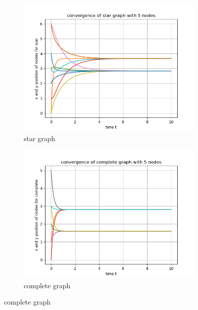 \documentclass{article}
\begin{document}
\begin{problem}
\begin{figure}[!ht]
        \begin{subfigure}{0.4\textwidth}
            \includegraphics[width=\textwidth]{./img/p1convergence_star_graph_5.png}
            \caption{star graph}
        \end{subfigure}
        \begin{subfigure}{0.4\textwidth}
            \includegraphics[width=\textwidth]{./img/p1convergence_complete_graph_5.png}
            \caption{complete graph}
        \end{subfigure}


\end{figure}
\end{problem}
\end{document}
